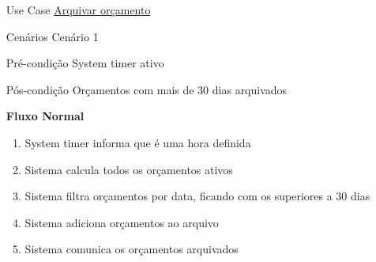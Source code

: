 \documentclass[../relatorio.tex]{subfiles}
\begin{document}
\begin{itemize}
    \item[Use Case] {\underline{Arquivar orçamento}}
    \item[Cenários] {Cenário 1}
    \item[Pré-condição] {System timer ativo}
    \item[Pós-condição] {Orçamentos com mais de 30 dias arquivados}
          \begin{flushleft}
              \textbf{Fluxo Normal}
          \end{flushleft}
          \begin{enumerate}
              \item System timer informa que é uma hora definida
              \item Sistema calcula todos os orçamentos ativos
              \item Sistema filtra orçamentos por data, ficando com os superiores a 30 dias
              \item Sistema adiciona orçamentos ao arquivo
              \item Sistema comunica os orçamentos arquivados
          \end{enumerate}
\end{itemize}
\end{document}
